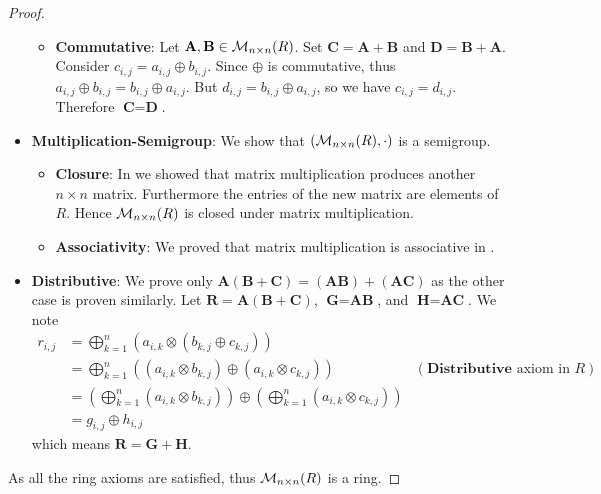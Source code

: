 \begin{proof}
\begin{itemize}
\begin{itemize}
            \item \textbf{Commutative}: Let $\textbf{A}, \textbf{B} \in \mathcal{M}_{n\times n}(R)$. Set $\textbf{C} = \textbf{A} + \textbf{B}$ and $\textbf{D} = \textbf{B} + \textbf{A}$. Consider $c_{i,j} = a_{i,j} \oplus b_{i,j}$. Since $\oplus$ is commutative, thus $a_{i,j} \oplus b_{i,j} = b_{i,j} \oplus a_{i,j}$. But $d_{i,j} = b_{i,j} \oplus a_{i,j}$, so we have $c_{i,j} = d_{i,j}$. Therefore $\textbf{C} = \textbf{D}$.
        \end{itemize}

        \item \textbf{Multiplication-Semigroup}: We show that $(\mathcal{M}_{n\times n}(R), \cdot)$ is a semigroup.
        \begin{itemize}
            \item \textbf{Closure}: In  we showed that matrix multiplication produces another $n \times n$ matrix. Furthermore the entries of the new matrix are elements of $R$. Hence $\mathcal{M}_{n\times n}(R)$ is closed under matrix multiplication.

            \item \textbf{Associativity}: We proved that matrix multiplication is associative in .
        \end{itemize}

        \item \textbf{Distributive}: We prove only $\textbf{A}(\textbf{B} + \textbf{C}) = (\textbf{AB}) + (\textbf{AC})$ as the other case is proven similarly. Let $\textbf{R} = \textbf{A}(\textbf{B} + \textbf{C})$, $\textbf{G} = \textbf{AB}$, and $\textbf{H} = \textbf{AC}$. We note
        \begin{align*}
            r_{i,j} &= \bigoplus_{k=1}^n \left(a_{i,k} \otimes \left(b_{k,j} \oplus c_{k,j}\right)\right)\\
            &= \bigoplus_{k=1}^n \left((a_{i,k} \otimes b_{k,j}) \oplus (a_{i,k} \otimes c_{k,j})\right) & (\textbf{Distributive}\text{ axiom in }R)\\
            &= \left(\bigoplus_{k=1}^n (a_{i,k} \otimes b_{k,j})\right) \oplus \left(\bigoplus_{k=1}^n (a_{i,k} \otimes c_{k,j})\right)\\
            &= g_{i,j}\oplus h_{i,j}
        \end{align*}
        which means $\textbf{R} = \textbf{G} + \textbf{H}$.
    \end{itemize}
    As all the ring axioms are satisfied, thus $\mathcal{M}_{n\times n}(R)$ is a ring.


\end{proof}
